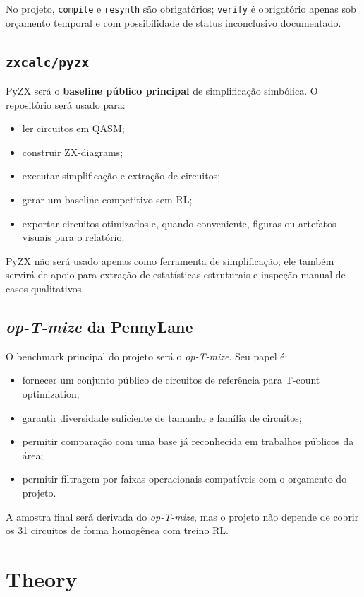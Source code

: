 \documentclass[a4paper,11pt]{article}
\begin{document}
No projeto, \texttt{compile} e \texttt{resynth} são obrigatórios; \texttt{verify} é obrigatório apenas sob orçamento temporal e com possibilidade de status inconclusivo documentado.

\subsection*{\texttt{zxcalc/pyzx}}

PyZX será o \textbf{baseline público principal} de simplificação simbólica. O repositório será usado para:
\begin{itemize}
  \item ler circuitos em QASM;
  \item construir ZX-diagrams;
  \item executar simplificação e extração de circuitos;
  \item gerar um baseline competitivo sem RL;
  \item exportar circuitos otimizados e, quando conveniente, figuras ou artefatos visuais para o relatório.
\end{itemize}

PyZX não será usado apenas como ferramenta de simplificação; ele também servirá de apoio para extração de estatísticas estruturais e inspeção manual de casos qualitativos.

\subsection*{\textit{op-T-mize} da PennyLane}

O benchmark principal do projeto será o \textit{op-T-mize}. Seu papel é:
\begin{itemize}
  \item fornecer um conjunto público de circuitos de referência para T-count optimization;
  \item garantir diversidade suficiente de tamanho e família de circuitos;
  \item permitir comparação com uma base já reconhecida em trabalhos públicos da área;
  \item permitir filtragem por faixas operacionais compatíveis com o orçamento do projeto.
\end{itemize}

A amostra final será derivada do \textit{op-T-mize}, mas o projeto não depende de cobrir os 31 circuitos de forma homogênea com treino RL.

\section{Theory}
\end{document}
